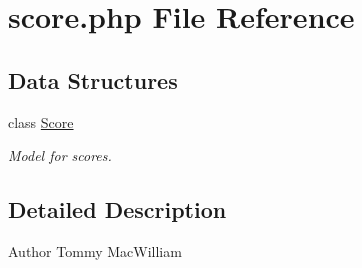 \hypertarget{score_8php}{
\section{score.php File Reference}
\label{score_8php}
}
\subsection*{Data Structures}
\begin{DoxyCompactItemize}
\item 
class \hyperlink{class_score}{Score}
\begin{DoxyCompactList}\small\item\em Model for scores. \item\end{DoxyCompactList}\end{DoxyCompactItemize}


\subsection{Detailed Description}
\begin{DoxyAuthor}{Author}
Tommy MacWilliam 
\end{DoxyAuthor}
